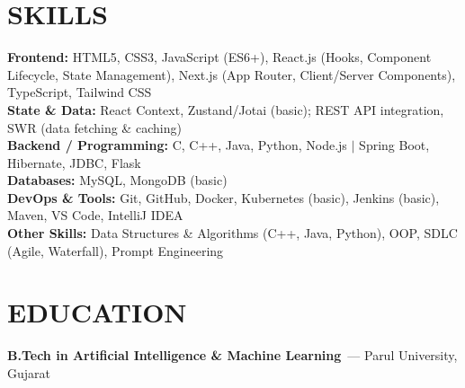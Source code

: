 \documentclass[a4paper,10pt]{article}
\begin{document}
\section{SKILLS}
\vspace{2pt}
\small
\textbf{Frontend:} HTML5, CSS3, JavaScript (ES6+), React.js (Hooks, Component Lifecycle, State Management), Next.js (App Router, Client/Server Components), TypeScript, Tailwind CSS\\[3pt]
\textbf{State \& Data:} React Context, Zustand/Jotai (basic); REST API integration, SWR (data fetching \& caching)\\[3pt]
\textbf{Backend / Programming:} C, C++, Java, Python, Node.js $|$ Spring Boot, Hibernate, JDBC, Flask\\[3pt]
\textbf{Databases:} MySQL, MongoDB (basic)\\[3pt]
\textbf{DevOps \& Tools:} Git, GitHub, Docker, Kubernetes (basic), Jenkins (basic), Maven, VS Code, IntelliJ IDEA\\[3pt]
\textbf{Other Skills:} Data Structures \& Algorithms (C++, Java, Python), OOP, SDLC (Agile, Waterfall), Prompt Engineering

\section{EDUCATION}
\vspace{2pt}
{\bfseries\small B.Tech in Artificial Intelligence \& Machine Learning}~{\small\color{graytext}--- Parul University, Gujarat}

\end{document}
